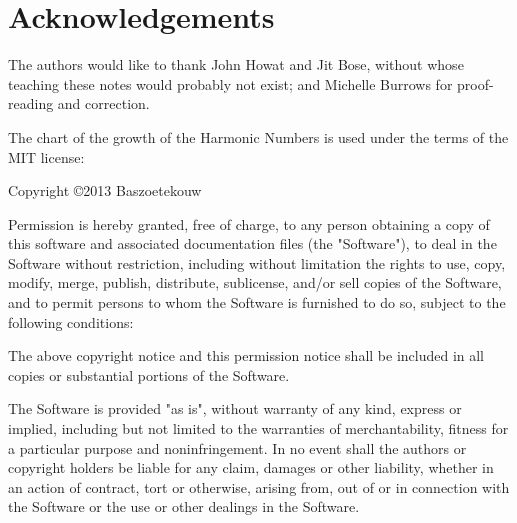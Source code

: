 \chapter{Acknowledgements}

The authors would like to thank John Howat and Jit Bose, without whose
teaching these notes would probably not exist; and Michelle Burrows
for proof-reading and correction.

The chart of the growth of the Harmonic Numbers is used under the
terms of the MIT license:

Copyright \copyright 2013 Baszoetekouw

Permission is hereby granted, free of charge, to any person obtaining
a copy of this software and associated documentation files (the
"Software"), to deal in the Software without restriction, including
without limitation the rights to use, copy, modify, merge, publish,
distribute, sublicense, and/or sell copies of the Software, and to
permit persons to whom the Software is furnished to do so, subject to
the following conditions:

The above copyright notice and this permission notice shall be
included in all copies or substantial portions of the Software.

The Software is provided "as is", without warranty of any kind,
express or implied, including but not limited to the warranties of
merchantability, fitness for a particular purpose and
noninfringement. In no event shall the authors or copyright holders be
liable for any claim, damages or other liability, whether in an action
of contract, tort or otherwise, arising from, out of or in connection
with the Software or the use or other dealings in the Software.
